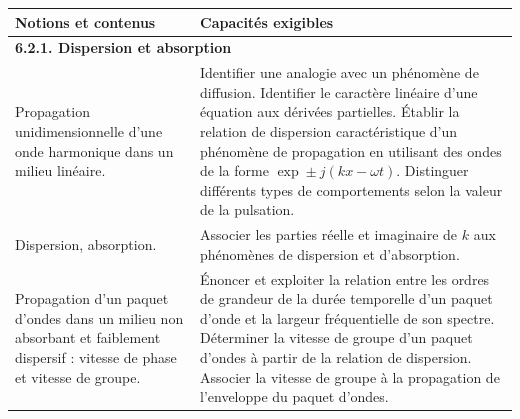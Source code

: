 {\scriptsize
        \begin{tabularx}{\textwidth}{|p{}|X|}
            \hline 
            \textbf{Notions et contenus} & \textbf{Capacités exigibles} \\
            \hline 
            \multicolumn{2}{|l|}{\textbf{6.2.1. Dispersion et absorption}} \\
            \hline
            Propagation unidimensionnelle d'une onde harmonique dans un milieu linéaire.  & 
            Identifier une analogie avec un phénomène de diffusion.
            Identifier le caractère linéaire d'une équation aux dérivées partielles.
            Établir la relation de dispersion caractéristique d'un phénomène de propagation en utilisant des ondes de la forme $\exp \pm j(k x-\omega t)$.
            Distinguer différents types de comportements selon la valeur de la pulsation. \\
            \hline 
            Dispersion, absorption.   & 
            Associer les parties réelle et imaginaire de $k$ aux phénomènes de dispersion et d'absorption. \\
        \hline 
            Propagation d'un paquet d'ondes dans un milieu non absorbant et faiblement dispersif : vitesse de phase et vitesse de groupe. & 
            Énoncer et exploiter la relation entre les ordres de grandeur de la durée temporelle d'un paquet d'onde et la largeur fréquentielle de son spectre. Déterminer la vitesse de groupe d'un paquet d'ondes à partir de la relation de dispersion.
             Associer la vitesse de groupe à la propagation de l'enveloppe du paquet d'ondes. \\
        \hline
        \end{tabularx}
}
